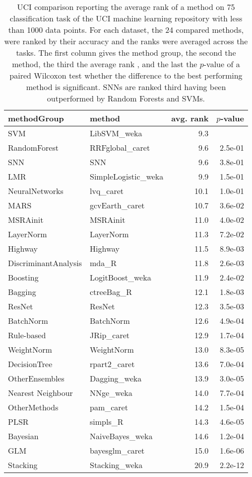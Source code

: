 \documentclass{article}
\begin{document}
\begin{table}[ht]
\caption[Method comparison on small UCI data sets]{UCI comparison reporting the average rank
of a method on 75 classification task of the 
UCI machine learning repository with  less than 1000 data points. 
For each dataset, the 24 compared methods, 
were ranked by their
accuracy and the ranks were averaged across the tasks. 
The first column gives the method group, the second the 
method, the third  
the average rank , and the last the $p$-value 
of a paired Wilcoxon test whether the difference to the best performing 
method is significant.
SNNs are ranked third having been outperformed by Random Forests and SVMs.  \label{tab:uciS1}}

\centering
\begin{tabular}{llrr}
  \toprule
 methodGroup & method & avg. rank & $p$-value \\ 
  \midrule
  SVM & LibSVM\_weka &  9.3 &\\ 
  RandomForest & RRFglobal\_caret &  9.6 & 2.5e-01 \\ 
  SNN & SNN &  9.6 & 3.8e-01 \\ 
  LMR & SimpleLogistic\_weka &  9.9 & 1.5e-01 \\ 
  NeuralNetworks & lvq\_caret & 10.1 & 1.0e-01 \\ 
  MARS & gcvEarth\_caret & 10.7 & 3.6e-02 \\ 
  MSRAinit & MSRAinit & 11.0 & 4.0e-02 \\ 
  LayerNorm & LayerNorm & 11.3 & 7.2e-02 \\ 
  Highway & Highway & 11.5 & 8.9e-03 \\ 
  DiscriminantAnalysis & mda\_R & 11.8 & 2.6e-03 \\ 
  Boosting & LogitBoost\_weka & 11.9 & 2.4e-02 \\ 
  Bagging & ctreeBag\_R & 12.1 & 1.8e-03 \\ 
  ResNet & ResNet & 12.3 & 3.5e-03 \\ 
  BatchNorm & BatchNorm & 12.6 & 4.9e-04 \\ 
  Rule-based & JRip\_caret & 12.9 & 1.7e-04 \\ 
  WeightNorm & WeightNorm & 13.0 & 8.3e-05 \\ 
  DecisionTree & rpart2\_caret & 13.6 & 7.0e-04 \\ 
  OtherEnsembles & Dagging\_weka & 13.9 & 3.0e-05 \\ 
  Nearest Neighbour & NNge\_weka & 14.0 & 7.7e-04 \\ 
  OtherMethods & pam\_caret & 14.2 & 1.5e-04 \\ 
  PLSR & simpls\_R & 14.3 & 4.6e-05 \\ 
  Bayesian & NaiveBayes\_weka & 14.6 & 1.2e-04 \\ 
  GLM & bayesglm\_caret & 15.0 & 1.6e-06 \\ 
  Stacking & Stacking\_weka & 20.9 & 2.2e-12 \\ 
   \bottomrule
\end{tabular}
\end{table}
\end{document}

